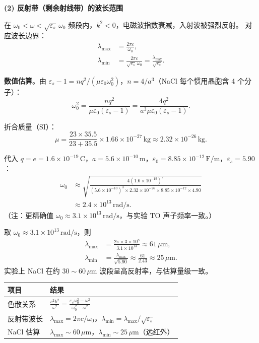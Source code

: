 \begin{derivationbox}[标准解题过程]
\textbf{(2) 反射带（剩余射线带）的波长范围}

在 $\omega_0<\omega<\sqrt{\varepsilon_s}\,\omega_0$ 频段内，$k^2<0$，电磁波指数衰减，入射波被强烈反射。
对应波长边界：
\begin{align}
\lambda_{\max}&=\frac{2\pi c}{\omega_0},\\
\lambda_{\min}&=\frac{2\pi c}{\sqrt{\varepsilon_s}\,\omega_0}=\frac{\lambda_{\max}}{\sqrt{\varepsilon_s}}.
\end{align}

\textbf{数值估算}。由 $\varepsilon_s-1=nq^2/(\mu\varepsilon_0\omega_0^2)$，$n=4/a^3$（NaCl 每个惯用晶胞含 4 个分子）：
\begin{equation}
\omega_0^2=\frac{nq^2}{\mu\varepsilon_0(\varepsilon_s-1)}
=\frac{4q^2}{a^3\mu\varepsilon_0(\varepsilon_s-1)}.
\end{equation}

折合质量（SI）：
\begin{equation}
\mu=\frac{23\times35.5}{23+35.5}\times1.66\times10^{-27}\,\text{kg}
\approx 2.32\times10^{-26}\,\text{kg}.
\end{equation}

代入 $q=e=1.6\times10^{-19}\,\text{C}$，$a=5.6\times10^{-10}\,\text{m}$，$\varepsilon_0=8.85\times10^{-12}\,\text{F/m}$，$\varepsilon_s=5.90$：
\begin{align}
\omega_0&\approx\sqrt{\frac{4(1.6\times10^{-19})^2}{(5.6\times10^{-10})^3\times2.32\times10^{-26}\times8.85\times10^{-12}\times4.90}}\\
&\approx 2.4\times10^{13}\,\text{rad/s}.
\end{align}
（注：更精确值 $\omega_0\approx3.1\times10^{13}\,\text{rad/s}$，与实验 TO 声子频率一致。）

取 $\omega_0\approx3.1\times10^{13}\,\text{rad/s}$，则
\begin{align}
\lambda_{\max}&=\frac{2\pi\times3\times10^8}{3.1\times10^{13}}\approx 61\,\mu\text{m},\\
\lambda_{\min}&=\frac{\lambda_{\max}}{\sqrt{5.90}}\approx\frac{61}{2.43}\approx 25\,\mu\text{m}.
\end{align}
实验上 NaCl 在约 $30\sim60\,\mu\text{m}$ 波段呈高反射率，与估算量级一致。
\end{derivationbox}

\begin{formulabox}[答案汇总]
\begin{center}
\begin{tabular}{ll}
\toprule
\textbf{项目} & \textbf{结果} \\
\midrule
色散关系 & $\displaystyle\frac{c^2k^2}{\omega^2}=\frac{\varepsilon_s\omega_0^2-\omega^2}{\omega_0^2-\omega^2}$ \\
反射带波长 & $\lambda_{\max}=2\pi c/\omega_0$，$\lambda_{\min}=\lambda_{\max}/\sqrt{\varepsilon_s}$ \\
NaCl 估算 & $\lambda_{\max}\sim60\,\mu\text{m}$，$\lambda_{\min}\sim25\,\mu\text{m}$（远红外） \\
\bottomrule
\end{tabular}
\end{center}
\end{formulabox}

